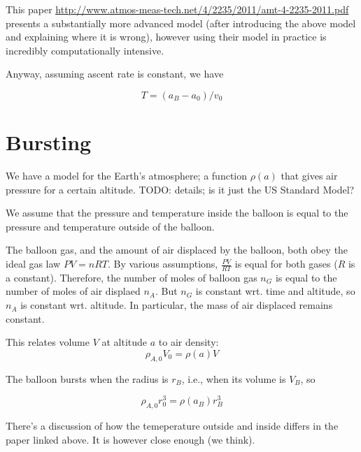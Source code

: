 \documentclass{article}
\begin{document}
This paper \underline{\url{http://www.atmos-meas-tech.net/4/2235/2011/amt-4-2235-2011.pdf}} presents
a substantially more advanced model (after introducing the above model and explaining
where it is wrong), however using their model in practice is incredibly computationally
intensive.

Anyway, assuming ascent rate is constant, we have

\[  T = (a_B - a_0) / v_0 \]

\section{Bursting}

We have a model for the Earth's atmosphere; a function $\rho(a)$ that gives
air pressure for a certain altitude.
TODO: details; is it just the US Standard Model?

We assume that the pressure and temperature inside the balloon is equal
to the pressure and temperature outside of the balloon.

The balloon gas, and the amount of air displaced by the balloon, both
obey the ideal gas law $PV=nRT$. By various assumptions, $\frac{PV}{RT}$ is
equal for both gases ($R$ is a constant).
Therefore, the number of moles of balloon gas $n_G$ is equal to the number
of moles of air displaed $n_A$. But $n_G$ is constant wrt. time and altitude,
so $n_A$ is constant wrt. altitude. In particular, the mass of air displaced
remains constant.

This relates volume $V$ at altitude $a$ to air density: 
\[
    \rho_{A,0} V_0 = \rho(a) V
\]

The balloon bursts when the radius is $r_B$, i.e., when its volume is $V_B$, so

\[
    \rho_{A,0} r_0^3 = \rho(a_B) r_B^3
\]

There's a discussion of how the temeperature outside and inside differs in
the paper linked above. It is however close enough (we think).
\end{document}
